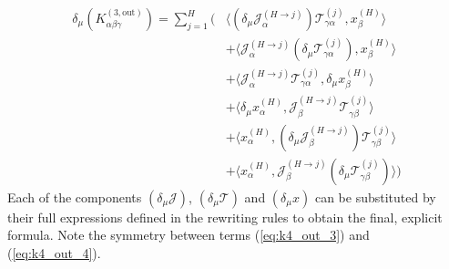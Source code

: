 \documentclass[11pt,a4paper]{article}
\theoremstyle{definition}
\begin{document}
\begin{align}
\delta_\mu(K^{(3, \text{out})}_{\alpha\beta\gamma}) = \sum_{j=1}^{H} \Biggl( & \langle (\delta_\mu \mathcal{J}^{(H \to j)}_{\alpha}) \mathcal{T}^{(j)}_{\gamma\alpha}, x^{(H)}_\beta \rangle \label{eq:k4_out_1} \\
& + \langle \mathcal{J}^{(H \to j)}_{\alpha} (\delta_\mu \mathcal{T}^{(j)}_{\gamma\alpha}), x^{(H)}_\beta \rangle \label{eq:k4_out_2} \\
& + \langle \mathcal{J}^{(H \to j)}_{\alpha} \mathcal{T}^{(j)}_{\gamma\alpha}, \delta_\mu x^{(H)}_\beta \rangle \label{eq:k4_out_3} \\
& + \langle \delta_\mu x^{(H)}_\alpha, \mathcal{J}^{(H \to j)}_{\beta} \mathcal{T}^{(j)}_{\gamma\beta} \rangle \label{eq:k4_out_4} \\
& + \langle x^{(H)}_\alpha, (\delta_\mu \mathcal{J}^{(H \to j)}_{\beta}) \mathcal{T}^{(j)}_{\gamma\beta} \rangle \label{eq:k4_out_5} \\
& + \langle x^{(H)}_\alpha, \mathcal{J}^{(H \to j)}_{\beta} (\delta_\mu \mathcal{T}^{(j)}_{\gamma\beta}) \rangle \label{eq:k4_out_6} \Biggr)
\end{align}
Each of the components $(\delta_\mu \mathcal{J})$, $(\delta_\mu \mathcal{T})$ and $(\delta_\mu x)$ can be substituted by their full expressions defined in the rewriting rules to obtain the final, explicit formula. Note the symmetry between terms (\ref{eq:k4_out_3}) and (\ref{eq:k4_out_4}).
\end{document}

